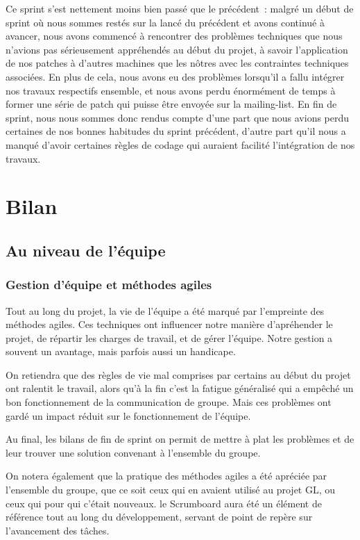 \documentclass[11pt]{article}
\begin{document}
Ce sprint s'est nettement moins bien passé que le précédent~: malgré
un début de sprint où nous sommes restés sur la lancé du précédent et
avons continué à avancer, nous avons commencé à rencontrer des
problèmes techniques que nous n'avions pas sérieusement appréhendés au
début du projet, à savoir l'application de nos patches à d'autres
machines que les nôtres avec les contraintes techniques
associées. En plus de cela, nous avons eu des problèmes lorsqu'il a
fallu intégrer nos travaux respectifs ensemble, et nous avons perdu
énormément de temps à former une série de patch qui puisse être
envoyée sur la mailing-list. En fin de sprint, nous nous sommes donc
rendus compte d'une part que nous avions perdu certaines de nos bonnes
habitudes du sprint précédent, d'autre part qu'il nous a manqué
d'avoir certaines règles de codage qui auraient facilité l'intégration
de nos travaux.

\section{Bilan}

\subsection*{Au niveau de l'équipe}

\subsubsection*{Gestion d'équipe et méthodes agiles}

Tout au long du projet, la vie de l'équipe a été marqué par l'empreinte des
méthodes agiles. Ces techniques ont influencer notre manière d'apréhender 
le projet, de répartir les charges de travail, et de gérer l'équipe. Notre
gestion a souvent un avantage, mais parfois aussi un handicape. 

On retiendra que des règles de vie mal comprises par certains au début du 
projet ont ralentit le travail, alors qu'à la fin c'est la fatigue généralisé
qui a empêché un bon fonctionnement de la communication de groupe. Mais ces
problèmes ont gardé un impact réduit sur le fonctionnement de l'équipe. 

Au final, les bilans de fin de sprint on permit de mettre à plat les problèmes
et de leur trouver une solution convenant à l'ensemble du groupe.

On notera également que la pratique des méthodes agiles a été apréciée par 
l'ensemble du groupe, que ce soit ceux qui en avaient utilisé au projet GL,
ou ceux qui pour qui c'était nouveaux. le Scrumboard aura été un élément de 
référence tout au long du développement, servant de point de repère sur 
l'avancement des tâches.
\end{document}
